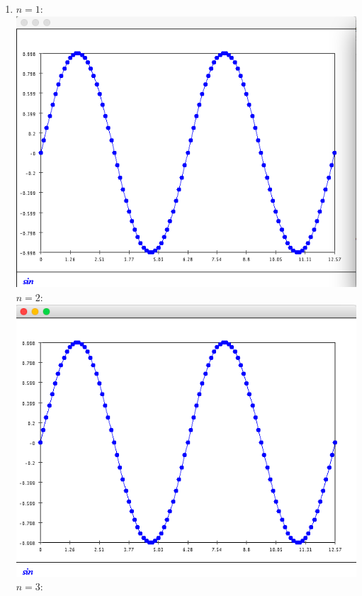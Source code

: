\documentclass{article}
\begin{document}
\begin{enumerate}
\item $n=1$:\\
\includegraphics[scale=0.5]{exercise2_n1}\\
$n=2$: \\
\includegraphics[scale=0.5]{exercise2_n2}\\
$n=3$:\\

\end{enumerate}
\end{document}
